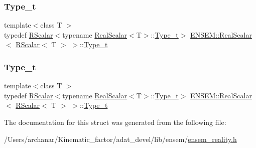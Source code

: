 \subsubsection{\texorpdfstring{Type\_t}{Type\_t}\hspace{0.1cm}{\footnotesize\ttfamily [1/2]}}
{\footnotesize\ttfamily template$<$class T $>$ \\
typedef \mbox{\hyperlink{classENSEM_1_1RScalar}{R\+Scalar}}$<$typename \mbox{\hyperlink{structENSEM_1_1RealScalar}{Real\+Scalar}}$<$T$>$\+::\mbox{\hyperlink{structENSEM_1_1RealScalar_3_01RScalar_3_01T_01_4_01_4_a98fef60a69ef8b4856721a6f7b115ce5}{Type\+\_\+t}}$>$ \mbox{\hyperlink{structENSEM_1_1RealScalar}{E\+N\+S\+E\+M\+::\+Real\+Scalar}}$<$ \mbox{\hyperlink{classENSEM_1_1RScalar}{R\+Scalar}}$<$ T $>$ $>$\+::\mbox{\hyperlink{structENSEM_1_1RealScalar_3_01RScalar_3_01T_01_4_01_4_a98fef60a69ef8b4856721a6f7b115ce5}{Type\+\_\+t}}}

\mbox{\label{structENSEM_1_1RealScalar_3_01RScalar_3_01T_01_4_01_4_a98fef60a69ef8b4856721a6f7b115ce5}} 
\subsubsection{\texorpdfstring{Type\_t}{Type\_t}\hspace{0.1cm}{\footnotesize\ttfamily [2/2]}}
{\footnotesize\ttfamily template$<$class T $>$ \\
typedef \mbox{\hyperlink{classENSEM_1_1RScalar}{R\+Scalar}}$<$typename \mbox{\hyperlink{structENSEM_1_1RealScalar}{Real\+Scalar}}$<$T$>$\+::\mbox{\hyperlink{structENSEM_1_1RealScalar_3_01RScalar_3_01T_01_4_01_4_a98fef60a69ef8b4856721a6f7b115ce5}{Type\+\_\+t}}$>$ \mbox{\hyperlink{structENSEM_1_1RealScalar}{E\+N\+S\+E\+M\+::\+Real\+Scalar}}$<$ \mbox{\hyperlink{classENSEM_1_1RScalar}{R\+Scalar}}$<$ T $>$ $>$\+::\mbox{\hyperlink{structENSEM_1_1RealScalar_3_01RScalar_3_01T_01_4_01_4_a98fef60a69ef8b4856721a6f7b115ce5}{Type\+\_\+t}}}



The documentation for this struct was generated from the following file\+:\begin{DoxyCompactItemize}
\item 
/\+Users/archanar/\+Kinematic\+\_\+factor/adat\+\_\+devel/lib/ensem/\mbox{\hyperlink{lib_2ensem_2ensem__reality_8h}{ensem\+\_\+reality.\+h}}\end{DoxyCompactItemize}
